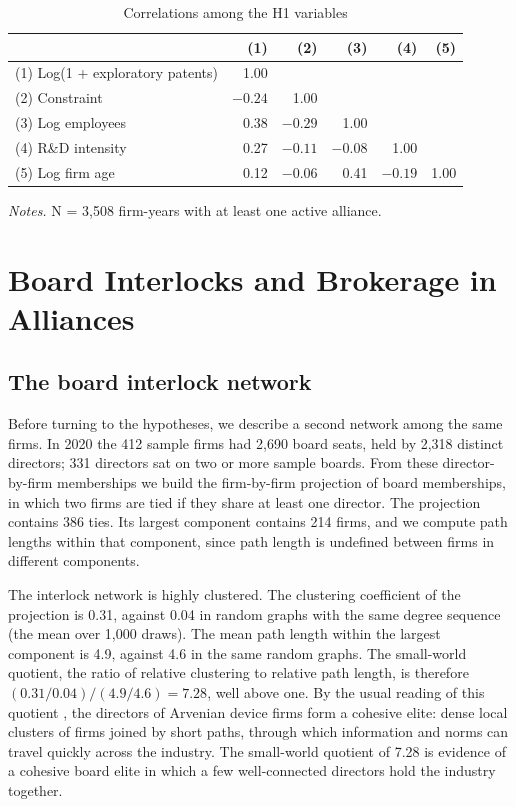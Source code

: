 \documentclass[12pt]{article}
\begin{document}
\begin{table}[!htbp]
\centering
\begin{threeparttable}
\caption{Correlations among the H1 variables}
\label{tab:corr}
\small
\begin{tabular}{lrrrrr}
\toprule
 & (1) & (2) & (3) & (4) & (5) \\
\midrule
(1) Log(1 + exploratory patents) & 1.00 & & & & \\
(2) Constraint & $-0.24$ & 1.00 & & & \\
(3) Log employees & 0.38 & $-0.29$ & 1.00 & & \\
(4) R\&D intensity & 0.27 & $-0.11$ & $-0.08$ & 1.00 & \\
(5) Log firm age & 0.12 & $-0.06$ & 0.41 & $-0.19$ & 1.00 \\
\bottomrule
\end{tabular}
\begin{tablenotes}
\footnotesize
\item \textit{Notes.} N = 3,508 firm-years with at least one active alliance.
\end{tablenotes}
\end{threeparttable}
\end{table}

\section{Board Interlocks and Brokerage in Alliances}

\subsection{The board interlock network}

Before turning to the hypotheses, we describe a second network among the same firms. In 2020 the 412 sample firms had 2,690 board seats, held by 2,318 distinct directors; 331 directors sat on two or more sample boards. From these director-by-firm memberships we build the firm-by-firm projection of board memberships, in which two firms are tied if they share at least one director. The projection contains 386 ties. Its largest component contains 214 firms, and we compute path lengths within that component, since path length is undefined between firms in different components.

The interlock network is highly clustered. The clustering coefficient of the projection is 0.31, against 0.04 in random graphs with the same degree sequence (the mean over 1,000 draws). The mean path length within the largest component is 4.9, against 4.6 in the same random graphs. The small-world quotient, the ratio of relative clustering to relative path length, is therefore $(0.31/0.04)/(4.9/4.6) = 7.28$, well above one. By the usual reading of this quotient \citep{uzzispiro2005}, the directors of Arvenian device firms form a cohesive elite: dense local clusters of firms joined by short paths, through which information and norms can travel quickly across the industry. The small-world quotient of 7.28 is evidence of a cohesive board elite in which a few well-connected directors hold the industry together.
\end{document}
